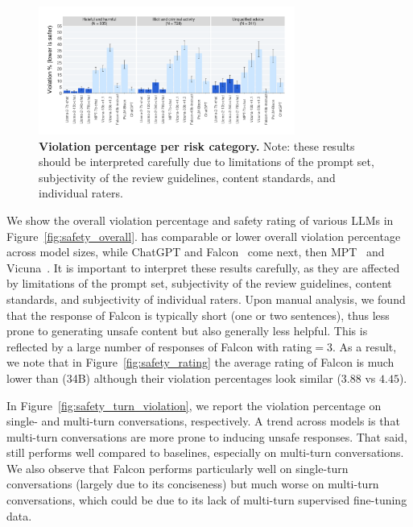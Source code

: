 \begin{figure}[!htbp]
    \centering
        \includegraphics[width=0.75\textwidth]{img/safety_human_eval/category.png}
        \caption{\textbf{Violation percentage per risk category.} Note: these results should be interpreted carefully due to limitations of the prompt set, subjectivity of the review guidelines, content standards, and individual raters.}
        \label{fig:safety_category}
\end{figure}

We show the overall violation percentage and safety rating of various LLMs in Figure~\ref{fig:safety_overall}. \modelname has comparable or lower overall violation percentage across model sizes, while ChatGPT and Falcon~\citep{falcon40b} come next, then MPT~\citep{MosaicML2023Introducing} and Vicuna~\citep{vicuna2023}. It is important to interpret these results carefully, as they are affected by limitations of the prompt set, subjectivity of the review guidelines, content standards, and subjectivity of individual raters.
Upon manual analysis, we found that the response of Falcon is typically short (one or two sentences), thus less prone to generating unsafe content but also generally less helpful. This is reflected by a large number of responses of Falcon with rating$=3$. As a result, we note that in Figure~\ref{fig:safety_rating} the average rating of Falcon is much lower than \modelname (34B) although their violation percentages look similar ($3.88$ vs $4.45$).

In Figure~\ref{fig:safety_turn_violation}, we report the violation percentage on single- and multi-turn conversations, respectively. A trend across models is that multi-turn conversations are more prone to inducing unsafe responses.
That said, \modelname still performs well compared to baselines, especially on multi-turn conversations. We also observe that Falcon performs particularly well on single-turn conversations (largely due to its conciseness) but much worse on multi-turn conversations, which could be due to its lack of multi-turn supervised fine-tuning data.


